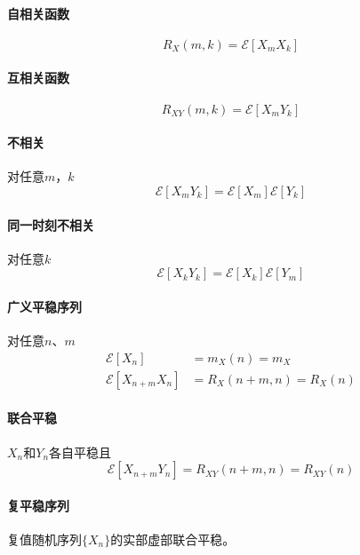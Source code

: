     \paragraph{自相关函数}
    \begin{equation}
        R_X(m,k)=\mathscr{E}[X_mX_k]
    \end{equation}
    \paragraph{互相关函数}
    \begin{equation}
        R_{XY}(m,k)=\mathscr{E}[X_mY_k]
    \end{equation}
    \paragraph{不相关}对任意$m$，$k$\vspace{-0.5ex}
    \begin{equation}
        \mathscr{E}[X_mY_k]=\mathscr{E}[X_m]\mathscr{E}[Y_k]
    \end{equation}
    \paragraph{同一时刻不相关}对任意$k$\vspace{-0.5ex}
    \begin{equation}
        \mathscr{E}[X_kY_k]=\mathscr{E}[X_k]\mathscr{E}[Y_m]
    \end{equation}
    \paragraph{广义平稳序列}对任意$n$、$m$\vspace{-0.5ex}
    \begin{align}
        \mathscr{E}[X_n]&=m_X(n)=m_X\\
        \mathscr{E}[X_{n+m}X_n]&=R_X(n+m,n)=R_X(n)
    \end{align}
    \paragraph{联合平稳}$X_n$和$Y_n$各自平稳且\vspace{-0.5ex}
    \begin{equation}
        \mathscr{E}[X_{n+m}Y_n]=R_{XY}(n+m,n)=R_{XY}(n)
    \end{equation}
    \paragraph{复平稳序列}复值随机序列$\{X_n\}$的实部虚部联合平稳。

